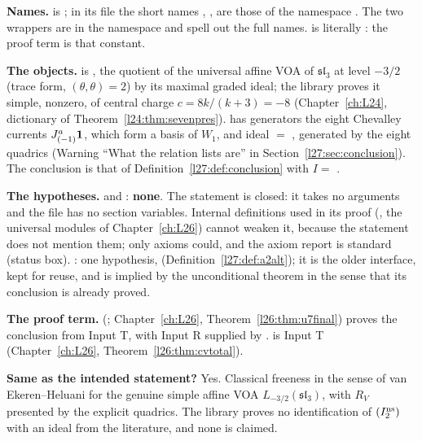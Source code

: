 \begin{dictionary}
\textbf{Names.}  is ; in its file the short names ,
,  are those of the namespace . The two wrappers are in the namespace
 and spell out the full names.  is literally
: the proof term is that constant.

\textbf{The objects.}  is , the quotient of the universal affine VOA of $\mathfrak{sl}_3$ at
level $-3/2$ (trace form, $(\theta,\theta)=2$) by its maximal graded ideal; the library proves it simple, nonzero, of central charge
$c=8k/(k+3)=-8$ (Chapter~\ref{ch:L24}, dictionary of Theorem~\ref{l24:thm:sevenpres}).  has generators the
eight Chevalley currents $J^a_{(-1)}\mathbf 1$, which form a basis of $W_1$, and ideal 
$=$ , generated by the eight quadrics (Warning ``What the relation lists are'' in
Section~\ref{l27:sec:conclusion}). The conclusion is that of Definition~\ref{l27:def:conclusion} with $I=$ .

\textbf{The hypotheses.}  and : \textbf{none}. The statement is closed: it takes
no arguments and the file has no section variables. Internal definitions used in its proof (, the universal modules
of Chapter~\ref{ch:L26}) cannot weaken it, because the statement does not mention them; only axioms could, and the axiom report is
standard (status box). : one hypothesis, 
(Definition~\ref{l27:def:a2alt}); it is the older interface, kept for reuse, and is implied by the unconditional theorem in the sense
that its conclusion is already proved.

\textbf{The proof term.}  (; Chapter~\ref{ch:L26},
Theorem~\ref{l26:thm:u7final}) proves the conclusion from Input T, with Input R supplied by .
 is Input T (Chapter~\ref{ch:L26}, Theorem~\ref{l26:thm:cvtotal}).

\textbf{Same as the intended statement?} Yes. Classical freeness in the sense of van Ekeren--Heluani for the genuine simple affine VOA
$L_{-3/2}(\mathfrak{sl}_3)$, with $R_V$ presented by the explicit quadrics. The library proves no identification of
$(I_2^{\mathrm{ns}})$ with an ideal from the literature, and none is claimed.
\end{dictionary}


